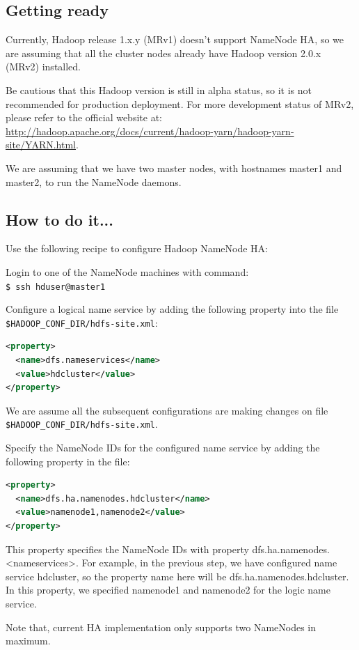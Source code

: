 \subsection*{Getting ready}
Currently, Hadoop release 1.x.y (MRv1) doesn't support NameNode HA, so we are assuming that all the cluster nodes already have Hadoop version 2.0.x (MRv2) installed.

Be cautious that this Hadoop version is still in alpha status, so it is not recommended for production deployment. For more development status of MRv2, please refer to the official website at:  \url{http://hadoop.apache.org/docs/current/hadoop-yarn/hadoop-yarn-site/YARN.html}.

We are assuming that we have two master nodes, with hostnames master1 and master2, to run the NameNode daemons.
\subsection*{How to do it...}
Use the following recipe to configure Hadoop NameNode HA:

Login to one of the NameNode machines with command: \\
\verb|$ ssh hduser@master1|

Configure a logical name service by adding the following property into the file \verb|$HADOOP_CONF_DIR/hdfs-site.xml|:
\lstset{style=bashstyle}
\begin{lstlisting}[language=XML]
<property>
  <name>dfs.nameservices</name>
  <value>hdcluster</value>
</property>
\end{lstlisting}

We are assume all the subsequent configurations are making changes on file \verb|$HADOOP_CONF_DIR/hdfs-site.xml|.

Specify the NameNode IDs for the configured name service by adding the following property in the file:
\lstset{style=bashstyle}
\begin{lstlisting}[language=XML]
<property>
  <name>dfs.ha.namenodes.hdcluster</name>
  <value>namenode1,namenode2</value>
</property>
\end{lstlisting}

This property specifies the NameNode IDs with property dfs.ha.namenodes.<nameservices>. For example, in the previous step, we have configured name service hdcluster, so the property name here will be dfs.ha.namenodes.hdcluster. In this property, we specified namenode1 and namenode2 for the logic name service.

Note that, current HA implementation only supports two NameNodes in maximum.

